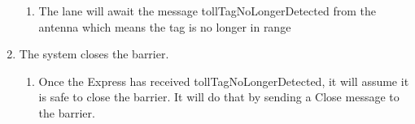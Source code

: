 \begin{enumerate}
\begin{enumerate}
\item The lane will await the message tollTagNoLongerDetected from the antenna
which means the tag is no longer in range
\end{enumerate}
\item The system closes the barrier.

\begin{enumerate}
\item Once the Express has received tollTagNoLongerDetected, it will assume
it is safe to close the barrier. It will do that by sending a Close
message to the barrier.\end{enumerate}
\end{enumerate}

